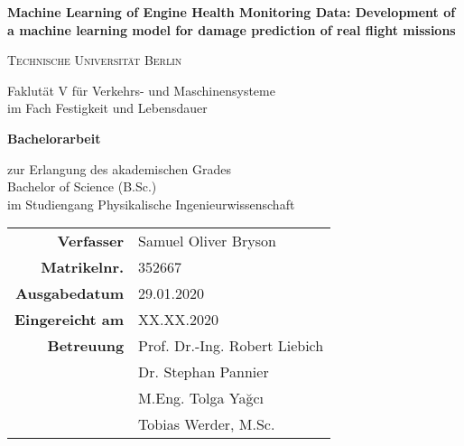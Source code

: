 
\begin{titlepage}

        \hfill {}

        \centering
        \vspace{1.5cm}
        {\Large \textbf{Machine Learning of Engine Health Monitoring Data: Development of a machine learning model for damage prediction of real flight missions}\par}
        \vspace{1cm}
        {\scshape\Large Technische Universit\"at Berlin \par}
        \vspace{0.2cm}
        {\large Faklut\"at V f\"ur Verkehrs- und Maschinensysteme\\im Fach Festigkeit und Lebensdauer\par}
        \vspace{1.5cm}
        {\huge\bfseries Bachelorarbeit\par}
        \vspace{0.6cm}
        {\large zur Erlangung des akademischen Grades \\Bachelor of Science (B.Sc.)\\im Studiengang Physikalische Ingenieurwissenschaft\par}
        \vspace{1.2cm}
        \begin{tabular}{>{\bfseries}r l}
            Verfasser & Samuel Oliver Bryson \\
            Matrikelnr. & 352667 \\
            Ausgabedatum & 29.01.2020 \\
            Eingereicht am & XX.XX.2020 \\
            Betreuung & Prof. Dr.-Ing. Robert Liebich \\
            & Dr. Stephan Pannier \\
            & M.Eng. Tolga Ya\u{g}c\i{}\\
            & Tobias Werder, M.Sc.\\
        \end{tabular}

\end{titlepage}